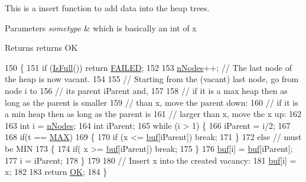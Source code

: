 This is a insert function to add data into the heap trees. 


\begin{DoxyParams}{Parameters}
{\em sometype} & which is basically an int of x \\
\hline
\end{DoxyParams}
\begin{DoxyReturn}{Returns}
returns O\+K 
\end{DoxyReturn}

\begin{DoxyCode}
150 \{
151     \textcolor{keywordflow}{if} (\hyperlink{classHEAP_ac2560a1c0edc4cecc583880fe6006a91}{IsFull}()) \textcolor{keywordflow}{return} \hyperlink{HEAP_8H_a32c27cc471df37f4fc818d65de0a56c4aecedb56d1405a60c6069f4a0139bdec5}{FAILED};
152 
153     \hyperlink{classHEAP_ad481b16366a0a0ff65418afc71d9e652}{nNodes}++;  \textcolor{comment}{// The last node of the heap is now vacant.}
154 
155     \textcolor{comment}{// Starting from the (vacant) last node, go from node i to}
156     \textcolor{comment}{//   its parent iParent and, }
157     
158     \textcolor{comment}{// if it is a max heap then as long as the parent is smaller }
159     \textcolor{comment}{//  than x, move the parent down:}
160     \textcolor{comment}{// if it is a min heap then as long as the parent is }
161     \textcolor{comment}{//  larger than x, move the x up:}
162 
163     \textcolor{keywordtype}{int} i = \hyperlink{classHEAP_ad481b16366a0a0ff65418afc71d9e652}{nNodes};
164     \textcolor{keywordtype}{int} iParent;
165     \textcolor{keywordflow}{while} (i > 1) \{
166         iParent = i/2;
167         
168         \textcolor{keywordflow}{if}(t == \hyperlink{classHEAP_a440ecc6b7771102dbaa63b3dacce6c27af40ccc5dc19d4acb72467707512926c6}{MAX})
169         \{
170             \textcolor{keywordflow}{if} (x <= \hyperlink{classHEAP_abe5af2e4e8f2bc55e5b2e70ffa43e630}{buf}[iParent]) \textcolor{keywordflow}{break};
171         \}
172         \textcolor{keywordflow}{else} \textcolor{comment}{// must be MIN}
173         \{
174             \textcolor{keywordflow}{if}( x >= \hyperlink{classHEAP_abe5af2e4e8f2bc55e5b2e70ffa43e630}{buf}[iParent]) \textcolor{keywordflow}{break};
175         \}
176         \hyperlink{classHEAP_abe5af2e4e8f2bc55e5b2e70ffa43e630}{buf}[i] = \hyperlink{classHEAP_abe5af2e4e8f2bc55e5b2e70ffa43e630}{buf}[iParent];
177         i = iParent;
178     \}
179 
180     \textcolor{comment}{// Insert x into the created vacancy:}
181     \hyperlink{classHEAP_abe5af2e4e8f2bc55e5b2e70ffa43e630}{buf}[i] = x;
182 
183     \textcolor{keywordflow}{return} \hyperlink{HEAP_8H_a32c27cc471df37f4fc818d65de0a56c4a2bc49ec37d6a5715dd23e85f1ff5bb59}{OK};
184 \}
\end{DoxyCode}
